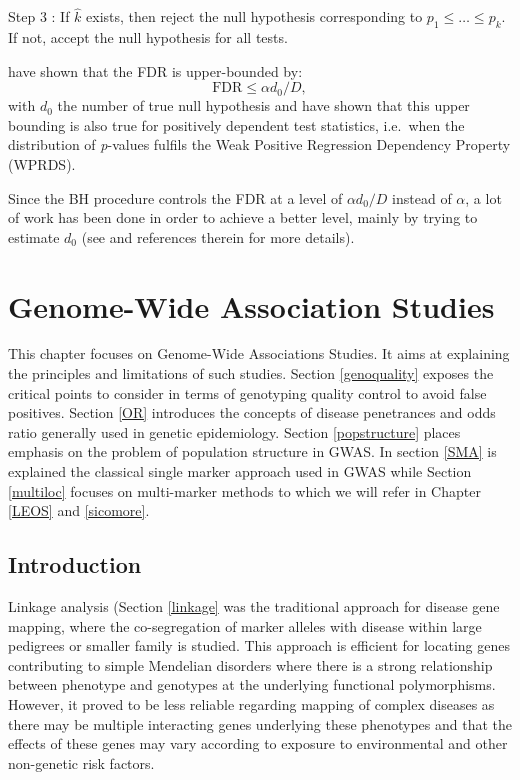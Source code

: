 \documentclass[]{book}
\begin{document}
Step 3 : If \(\hat{k}\) exists, then reject the null hypothesis corresponding
to \(p_1 \leq \dots \leq p_k\). If not, accept the null hypothesis for
all tests.

\citep{benjamini_controlling_1995} have shown that the FDR is upper-bounded
by: \[\text{FDR} \leq \alpha d_0/D,\] with \(d_0\) the number of true null
hypothesis and have shown that this upper bounding is also true for
positively dependent test statistics, i.e.~when the distribution of
\emph{p}-values fulfils the Weak Positive Regression Dependency Property
(WPRDS).

Since the BH procedure controls the FDR at a level of \(\alpha d_0/D\)
instead of \(\alpha\), a lot of work has been done in order to achieve a
better level, mainly by trying to estimate \(d_0\) (see \citep{roquain2010type}
and references therein for more details).

\hypertarget{genome-wide-association-studies}{%
\chapter{Genome-Wide Association Studies}\label{genome-wide-association-studies}}

This chapter focuses on Genome-Wide Associations Studies. It aims at explaining the principles and limitations of such studies. Section \ref{genoquality} exposes the critical points to consider in terms of genotyping quality control to avoid false positives. Section \ref{OR} introduces the concepts of disease penetrances and odds ratio generally used in genetic epidemiology. Section \ref{popstructure} places emphasis on the problem of population structure in GWAS. In section \ref{SMA} is explained the classical single marker approach used in GWAS while Section \ref{multiloc} focuses on multi-marker methods to which we will refer in Chapter \ref{LEOS} and \ref{sicomore}.

\hypertarget{introduction-2}{%
\section{Introduction}\label{introduction-2}}

Linkage analysis (Section \ref{linkage} was the traditional approach
for disease gene mapping, where the co-segregation of marker alleles
with disease within large pedigrees or smaller family is studied. This
approach is efficient for locating genes contributing to simple
Mendelian disorders where there is a strong relationship between
phenotype and genotypes at the underlying functional polymorphisms.
However, it proved to be less reliable regarding mapping of complex
diseases as there may be multiple interacting genes underlying these
phenotypes and that the effects of these genes may vary according to
exposure to environmental and other non-genetic risk factors.
\end{document}
